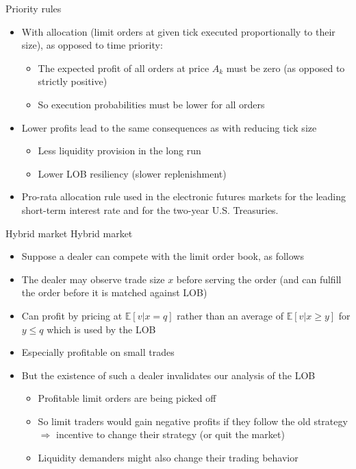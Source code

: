 \documentclass[english,10pt
,aspectratio=169
]{beamer}
\begin{document}
\begin{frame}{Priority rules}
	\begin{itemize}
		\item With  allocation (limit orders at given tick executed proportionally to their size), as opposed to \alert{time priority}:
		\begin{itemize}
			\item The expected profit of all orders at price $A_k$ must be zero (as opposed to strictly positive)
			\item So execution probabilities must be lower for all orders
		\end{itemize}
		\item Lower profits lead to the same consequences as with reducing tick size
		\begin{itemize}
			\item Less liquidity provision in the long run
			\item Lower LOB resiliency (slower replenishment)
		\end{itemize}
		\item Pro-rata allocation rule used in the electronic futures markets for the leading short-term interest rate and for the two-year U.S. Treasuries.
	\end{itemize}
\end{frame}


\begin{frame}{Hybrid market}
	Hybrid market
	\begin{itemize}
		\item Suppose a \alert{dealer} can compete with the limit order book, as follows
		\item The dealer may observe trade size $x$ before serving the order (and can fulfill the order before it is matched against LOB)
		\item Can profit by pricing at $\mathbb{E}[v|x=q]$ rather than an average of $\mathbb{E}[v|x \geq y]$ for $y \leq q$ which is used by the LOB
		\item Especially profitable on small trades
		\item But the existence of such a dealer invalidates our analysis of the LOB
		\begin{itemize}
			\item Profitable limit orders are being picked off
			\item So limit traders would gain negative profits if they follow the old strategy $\Rightarrow$ incentive to change their strategy (or quit the market)
			\item Liquidity demanders might also change their trading behavior
		\end{itemize}
	\end{itemize}
\end{frame}
\end{document}
